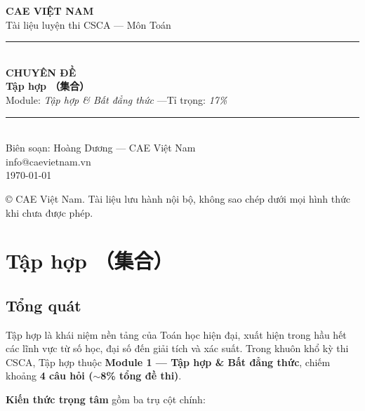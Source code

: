 \documentclass[12pt, a4paper]{report}
\newcommand{\cjk}[1]{{\cjkfont #1}}
\begin{document}
\setcounter{chapter}{1}

\begin{titlepage}
  \centering
  \vspace*{1.5cm}
  {\Large\bfseries\color{cae_blue} CAE VIỆT NAM}\\[0.3cm]
  {\small Tài liệu luyện thi CSCA — Môn Toán}\\[2.5cm]

  {\color{cae_gold}\rule{0.5\linewidth}{0.8pt}}\\[0.8cm]
  {\Huge\bfseries\color{cae_blue} CHUYÊN ĐỀ~\thechapter}\\[0.4cm]
  {\LARGE\bfseries Tập hợp \cjk{（集合）}}\\[0.6cm]
  {\large Module: \emph{Tập hợp \& Bất đẳng thức} \quad—\quad Tỉ trọng: \emph{17\%}}\\[0.8cm]
  {\color{cae_gold}\rule{0.5\linewidth}{0.8pt}}\\[2.5cm]

  {\normalsize Biên soạn: Hoàng Dương — CAE Việt Nam}\\
  {\small info@caevietnam.vn}\\[0.3cm]
  {\small \today}

  \vfill
  {\footnotesize © CAE Việt Nam. Tài liệu lưu hành nội bộ, không sao chép dưới mọi hình thức khi chưa được phép.}
\end{titlepage}

\tableofcontents
\clearpage

\chapter{Tập hợp \cjk{（集合）}}
\label{ch:tap-hop}

\section{Tổng quát}

Tập hợp là khái niệm nền tảng của Toán học hiện đại, xuất hiện trong hầu hết các lĩnh vực từ số học, đại số đến giải tích và xác suất. Trong khuôn khổ kỳ thi CSCA, Tập hợp thuộc \textbf{Module 1 — Tập hợp \& Bất đẳng thức}, chiếm khoảng \textbf{4 câu hỏi (\(\sim\)8\% tổng đề thi)}.

\textbf{Kiến thức trọng tâm} gồm ba trụ cột chính:
\end{document}
